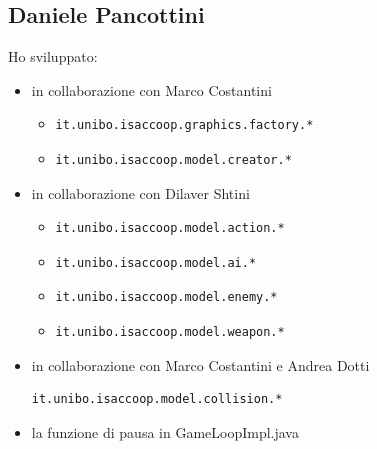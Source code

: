 \documentclass[a4paper,12pt]{report}
\begin{document}
\subsection*{Daniele Pancottini}
Ho sviluppato:
\begin{itemize}
    \item in collaborazione con Marco Costantini 
    \begin{itemize}
        \item \begin{verbatim}it.unibo.isaccoop.graphics.factory.* \end{verbatim}
        \item \begin{verbatim}it.unibo.isaccoop.model.creator.* \end{verbatim}
    \end{itemize}
    \item in collaborazione con Dilaver Shtini 
    \begin{itemize}
        \item \begin{verbatim}it.unibo.isaccoop.model.action.* \end{verbatim}
        \item \begin{verbatim}it.unibo.isaccoop.model.ai.* \end{verbatim}
        \item \begin{verbatim}it.unibo.isaccoop.model.enemy.* \end{verbatim}
        \item \begin{verbatim}it.unibo.isaccoop.model.weapon.* \end{verbatim}
    \end{itemize}
    \item in collaborazione con Marco Costantini e Andrea Dotti \begin{verbatim}it.unibo.isaccoop.model.collision.* \end{verbatim}
    \item la funzione di pausa in GameLoopImpl.java
\end{itemize}
\end{document}
